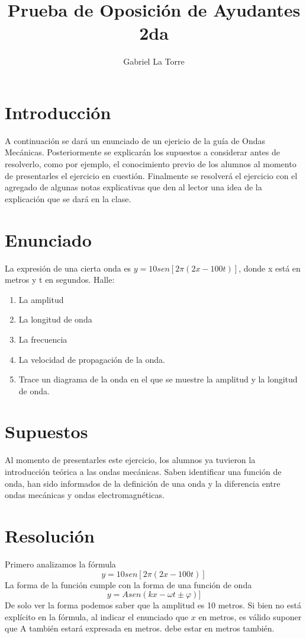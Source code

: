 \documentclass[spanish] {article}
\begin{document}
\title{Prueba de Oposición de Ayudantes 2da}
\author{Gabriel La Torre}

\maketitle
\newpage
\section{Introducción}
A continuación se dará un enunciado de un ejericio de la guía de Ondas Mecánicas. Posteriormente se explicarán los supuestos a considerar antes de resolverlo, como por ejemplo, el conocimiento previo de los alumnos al momento de presentarles el ejercicio en cuestión.
Finalmente se resolverá el ejercicio con el agregado de algunas notas explicativas que den al lector una idea de la explicación que se dará en la clase.
\section{Enunciado}
La expresión de una cierta onda es $y = 10 sen [2 \pi (2x- 100 t)]$, donde x está en metros y t en 
segundos. Halle: 
\begin{enumerate}
\item La amplitud
\item La longitud de onda
\item La frecuencia
\item La velocidad de propagación de la onda. 
\item Trace un diagrama de la onda en el que se muestre la amplitud y la longitud de onda. 
\end{enumerate}

\section{Supuestos}
Al momento de presentarles este ejercicio, los alumnos ya tuvieron la introducción teórica a las ondas mecánicas. Saben identificar una función de onda, han sido informados de la definición de una onda y la diferencia entre ondas mecánicas y ondas electromagnéticas.
\section{Resolución}
Primero analizamos la fórmula
$$y = 10 sen [2 \pi (2x- 100 t)]$$
La forma de la función cumple con la forma de una función de onda
$$y = A sen (kx- \omega t \pm \varphi)]$$
De solo ver la forma podemos saber que la amplitud es 10 metros. Si bien no está explícito en la fórmula, al indicar el enunciado que $x$ en metros, es válido suponer que A también estará expresada en metros.
debe estar en metros también.
\end{document}
